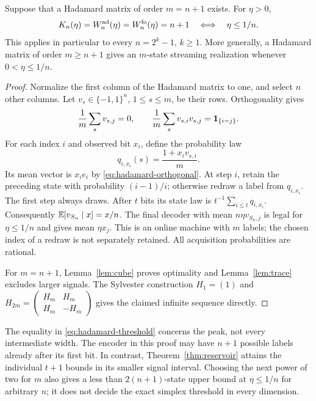 \begin{theorem}
\label{thm:hadamard}
Suppose that a Hadamard matrix of order $m=n+1$ exists. For $\eta>0$,
\begin{equation}\label{eq:hadamard-threshold}
 K_n(\eta)=W_n^{\rm ad}(\eta)=W_n^{\rm fo}(\eta)=n+1
       \quad\Longleftrightarrow\quad \eta\le1/n.
\end{equation}
This applies in particular to every $n=2^k-1$, $k\ge1$.
More generally, a Hadamard matrix of order $m\ge n+1$ gives an
$m$-state streaming realization whenever $0<\eta\le1/n$.
\end{theorem}
\begin{proof}
Normalize the first column of the Hadamard matrix to one, and select
$n$ other columns. Let $v_s\in\{-1,1\}^n$, $1\le s\le m$, be
their rows. Orthogonality gives
\begin{equation}\label{eq:hadamard-orthogonal}
 \frac1m\sum_s v_{s,j}=0,
 \qquad \frac1m\sum_s v_{s,i}v_{s,j}=\mathbf1_{\{i=j\}}.
\end{equation}
For each index $i$ and observed bit $x_i$, define the probability law
\[
 q_{i,x_i}(s)=\frac{1+x_i v_{s,i}}m.
\]
Its mean vector is $x_i e_i$ by \eqref{eq:hadamard-orthogonal}.
At step $i$, retain the preceding state with probability $(i-1)/i$;
otherwise redraw a label from $q_{i,x_i}$. The first step always draws.
After $t$ bits its state law is $t^{-1}\sum_{i\le t}q_{i,x_i}$.
Consequently $\mathbb E[v_{S_n}\mid x]=x/n$. The final decoder with mean
$n\eta v_{S_n,j}$ is legal for $\eta\le1/n$ and gives mean $\eta x_j$.
This is an online machine with $m$ labels; the chosen index of a redraw
is not separately retained. All acquisition probabilities are rational.

For $m=n+1$, Lemma~\ref{lem:cube} proves optimality and
Lemma~\ref{lem:trace} excludes larger signals. The Sylvester construction
$H_1=(1)$ and
$H_{2m}=\begin{pmatrix}H_m&H_m\\H_m&-H_m\end{pmatrix}$ gives the
claimed infinite sequence directly.
\end{proof}
The equality in \eqref{eq:hadamard-threshold} concerns the peak, not
every intermediate width. The encoder in this proof may have $n+1$
possible labels already after its first bit. In contrast,
Theorem~\ref{thm:reservoir} attains the individual $t+1$ bounds in its
smaller signal interval. Choosing the next power of two for $m$ also
gives a less than $2(n+1)$-state upper bound at $\eta\le1/n$ for
arbitrary $n$; it does not decide the exact simplex threshold in every
dimension.
